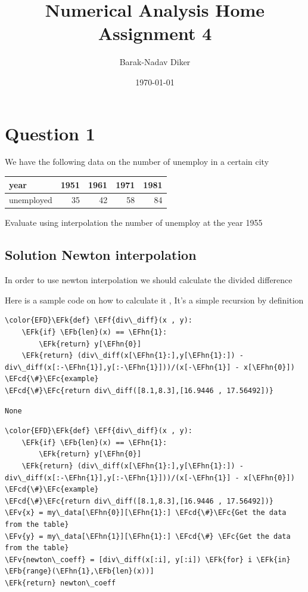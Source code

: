 \documentclass[11pt]{article}
\author{Barak-Nadav Diker}
\date{\today}
\title{Numerical Analysis Home Assignment 4}
\newcommand{\EFc}[1]{\textcolor{EFc}{#1}} %
\newcommand{\EFcd}[1]{\textcolor{EFcd}{#1}} %
\newcommand{\EFk}[1]{\textcolor{EFk}{#1}} %
\newcommand{\EFb}[1]{\textcolor{EFb}{#1}} %
\newcommand{\EFf}[1]{\textcolor{EFf}{#1}} %
\newcommand{\EFv}[1]{\textcolor{EFv}{#1}} %
\newcommand{\EFhn}[1]{\textcolor{EFhn}{#1}} %
\begin{document}
\maketitle
\tableofcontents

\section{Question 1}
\label{sec:org512ea0e}
We have the following data on the number of unemploy in a certain city
\begin{table}[htbp]
\label{data1}
\centering
\begin{tabular}{lrrrr}
\hline
year & 1951 & 1961 & 1971 & 1981\\
\hline
unemployed & 35 & 42 & 58 & 84\\
\hline
\end{tabular}
\end{table}
Evaluate using interpolation the number of unemploy at the year 1955
\subsection{Solution Newton interpolation}
\label{sec:org9b46594}
In order to use newton interpolation we should calculate the divided difference

Here is a sample code on how to calculate it , It's a simple recursion by definition
\begin{Code}
\begin{Verbatim}
\color{EFD}\EFk{def} \EFf{div\_diff}(x , y):
    \EFk{if} \EFb{len}(x) == \EFhn{1}:
        \EFk{return} y[\EFhn{0}]
    \EFk{return} (div\_diff(x[\EFhn{1}:],y[\EFhn{1}:]) - div\_diff(x[:-\EFhn{1}],y[:-\EFhn{1}]))/(x[-\EFhn{1}] - x[\EFhn{0}])
\EFcd{\#}\EFc{example}
\EFcd{\#}\EFc{return div\_diff([8.1,8.3],[16.9446 , 17.56492])}
\end{Verbatim}
\end{Code}

\begin{verbatim}
None
\end{verbatim}


\newpage

\begin{Code}
\begin{Verbatim}
\color{EFD}\EFk{def} \EFf{div\_diff}(x , y):
    \EFk{if} \EFb{len}(x) == \EFhn{1}:
        \EFk{return} y[\EFhn{0}]
    \EFk{return} (div\_diff(x[\EFhn{1}:],y[\EFhn{1}:]) - div\_diff(x[:-\EFhn{1}],y[:-\EFhn{1}]))/(x[-\EFhn{1}] - x[\EFhn{0}])
\EFcd{\#}\EFc{example}
\EFcd{\#}\EFc{return div\_diff([8.1,8.3],[16.9446 , 17.56492])}
\EFv{x} = my\_data[\EFhn{0}][\EFhn{1}:] \EFcd{\#}\EFc{Get the data from the table}
\EFv{y} = my\_data[\EFhn{1}][\EFhn{1}:] \EFcd{\#} \EFc{Get the data from the table}
\EFv{newton\_coeff} = [div\_diff(x[:i], y[:i]) \EFk{for} i \EFk{in} \EFb{range}(\EFhn{1},\EFb{len}(x))]
\EFk{return} newton\_coeff
\end{Verbatim}
\end{Code}
\end{document}
